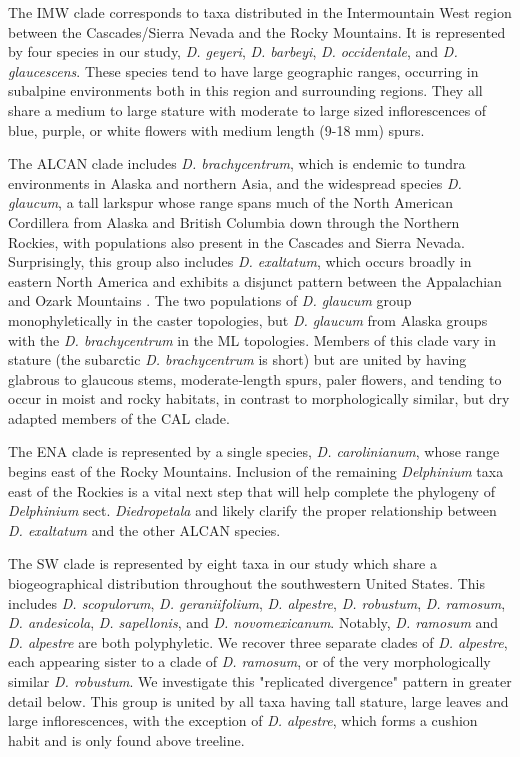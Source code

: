 \documentclass[11pt]{article}
\begin{document}
The IMW clade corresponds to taxa distributed in the Intermountain West region 
between the Cascades/Sierra Nevada and the Rocky Mountains.
It is represented by four species in our study, 
\emph{D. geyeri}, \emph{D. barbeyi}, \emph{D. occidentale}, and \emph{D. glaucescens}.
These species tend to have large geographic ranges, occurring in subalpine
environments both in this region and surrounding regions.
% 
They all share a medium to large stature with moderate to large sized inflorescences of blue, purple, or white flowers with medium length (9-18 mm) spurs. 


The ALCAN clade includes \emph{D. brachycentrum}, which is endemic to tundra environments in Alaska and northern Asia, and the widespread species \emph{D. glaucum}, a tall larkspur whose range spans much of the North American Cordillera from Alaska and British Columbia down through the Northern Rockies, with populations also present in the Cascades and Sierra Nevada. 
Surprisingly, this group also includes \emph{D. exaltatum}, which occurs broadly in eastern North America and exhibits a disjunct pattern between the Appalachian and Ozark Mountains \citep{mohn2021exaltatum}. The two populations of \emph{D. glaucum} group monophyletically in the caster topologies, 
but \emph{D. glaucum} from Alaska groups with the \emph{D. brachycentrum} in the ML topologies.
Members of this clade vary in stature (the subarctic \emph{D. brachycentrum} is short) 
but are united by having glabrous to glaucous stems, moderate‑length spurs, 
paler flowers, and tending to occur in moist and rocky habitats, in contrast to 
morphologically similar, but dry adapted members of the CAL clade.

The ENA clade is represented by a single species, \emph{D. carolinianum}, whose range begins east of the Rocky Mountains. Inclusion of the remaining \emph{Delphinium} taxa east of the Rockies is a vital next step that will help complete the phylogeny of \emph{Delphinium} sect. \emph{Diedropetala} and likely clarify the proper relationship between \emph{D. exaltatum} and the other ALCAN species.

The SW clade is represented by eight taxa in our study which share a biogeographical
distribution throughout the southwestern United States. This includes
\emph{D. scopulorum}, \emph{D. geraniifolium}, \emph{D. alpestre},
\emph{D. robustum}, \emph{D. ramosum}, \emph{D. andesicola}, \emph{D. sapellonis},
and \emph{D. novomexicanum}. Notably, \emph{D. ramosum} and \emph{D. alpestre}
are both polyphyletic. We recover three separate clades of \emph{D. alpestre}, each
appearing sister to a clade of \emph{D. ramosum}, or of the very morphologically
similar \emph{D. robustum}. We investigate this "replicated divergence" pattern in 
greater detail below. This group is united by all taxa having tall stature, 
large leaves and large inflorescences, with the exception of \emph{D. alpestre}, which forms a cushion habit and is only found above treeline.
\end{document}
